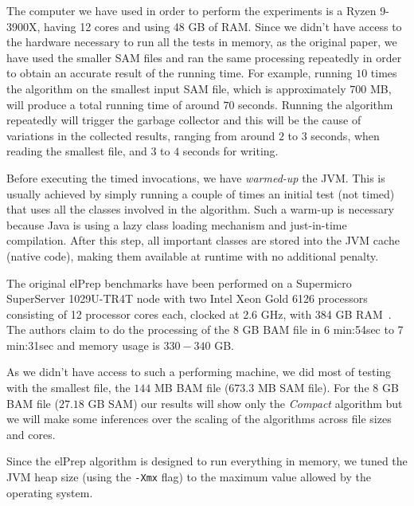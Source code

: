 \documentclass[a4paper,twoside]{article}
\begin{document}
The computer we have used in order to perform the experiments is a Ryzen 9-3900X, having 12 cores and using 48 GB of RAM\@.
Since we didn't have access to the hardware necessary to run all the tests in memory, as the original paper, we have used the smaller SAM files and ran the same processing repeatedly in order to obtain an accurate result of the running time.
For example, running $10$ times the algorithm on the smallest input SAM file, which is approximately $700$ MB, will produce a total running time of around $70$ seconds. 
Running the algorithm repeatedly will trigger the garbage collector and this will be the cause of variations in the collected results, ranging from around $2$ to $3$ seconds, when reading the smallest file, and $3$ to $4$ seconds for writing.

Before executing the timed invocations, we have {\textit{warmed-up}} the JVM\@.
This is usually achieved by simply running a couple of times an initial test (not timed) that uses all the classes involved in the algorithm.
Such a warm-up is necessary because Java is using a lazy class loading mechanism and just-in-time compilation.
After this step, all important classes are stored into the JVM cache (native code), making them available at runtime with no additional penalty.

The original elPrep benchmarks have been performed on a Supermicro SuperServer 1029U-TR4T node with two
Intel Xeon Gold 6126 processors consisting of 12 processor cores each, clocked at 2.6 GHz, with 384 GB RAM~\cite{costanza:2019}.
The authors claim to do the processing of the 8 GB BAM file in 6 min:54sec to 7 min:31sec and memory usage is $330-340$ GB\@.

As we didn't have access to such a performing machine, we did most of testing with the smallest file, the $144$ MB BAM file ($673.3$ MB SAM file). For the $8$ GB BAM file ($27.18$ GB SAM) our results will show only the {\it Compact} algorithm but we will make some inferences over the scaling of the algorithms across file sizes and cores.

Since the elPrep algorithm is designed to run everything in memory, we tuned the JVM heap size (using the \texttt{-Xmx} flag) to the maximum value allowed by the operating system. 
\end{document}
